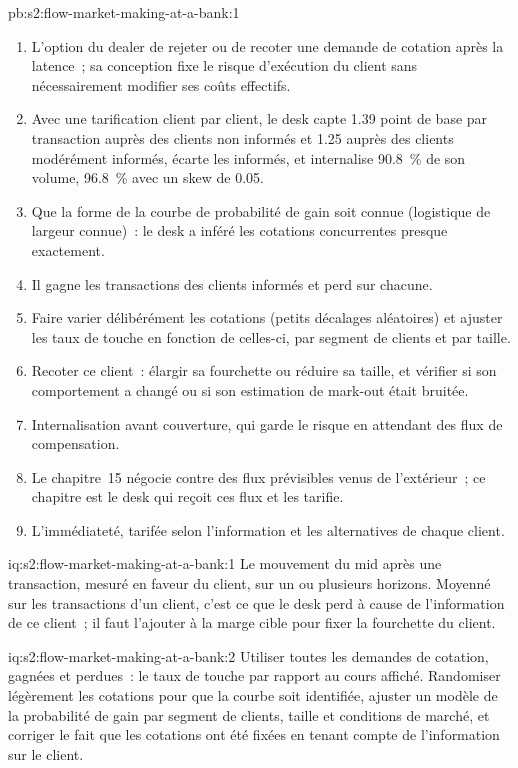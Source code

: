 \begin{solution}{pb:s2:flow-market-making-at-a-bank:1}
\begin{enumerate}
\item L'option du dealer de rejeter ou de recoter une demande de cotation après la latence~; sa conception fixe le risque d'exécution du client sans nécessairement modifier ses
coûts effectifs.
\item Avec une tarification client par client, le desk capte 1.39 point de base par transaction auprès des clients non informés et 1.25 auprès des clients modérément informés, écarte
les informés, et internalise 90.8~\% de son volume, 96.8~\% avec un skew de 0.05.
\item Que la forme de la courbe de probabilité de gain soit connue (logistique de largeur connue)~: le desk a inféré les cotations concurrentes presque exactement.
\item Il gagne les transactions des clients informés et perd sur chacune.
\item Faire varier délibérément les cotations (petits décalages aléatoires) et ajuster les taux de touche en fonction de celles-ci, par segment de clients et par taille.
\item Recoter ce client~: élargir sa fourchette ou réduire sa taille, et vérifier si son comportement a changé ou si son estimation de mark-out était bruitée.
\item Internalisation avant couverture, qui garde le risque en attendant des flux de compensation.
\item Le chapitre~15 négocie contre des flux prévisibles venus de l'extérieur~; ce chapitre est le desk qui reçoit ces flux et les tarifie.
\item L'immédiateté, tarifée selon l'information et les alternatives de chaque client.
\end{enumerate}
\end{solution}

\begin{solution}{iq:s2:flow-market-making-at-a-bank:1}
Le mouvement du mid après une transaction, mesuré en faveur du client, sur un ou plusieurs horizons. Moyenné sur les transactions d'un client, c'est ce que le desk perd
à cause de l'information de ce client~; il faut l'ajouter à la marge cible pour fixer la fourchette du client.
\end{solution}

\begin{solution}{iq:s2:flow-market-making-at-a-bank:2}
Utiliser toutes les demandes de cotation, gagnées et perdues~: le taux de touche par rapport au cours affiché. Randomiser légèrement les cotations pour que la courbe soit identifiée, ajuster un modèle de la
probabilité de gain par segment de clients, taille et conditions de marché, et corriger le fait que les cotations ont été fixées en tenant compte de l'information sur le client.
\end{solution}

